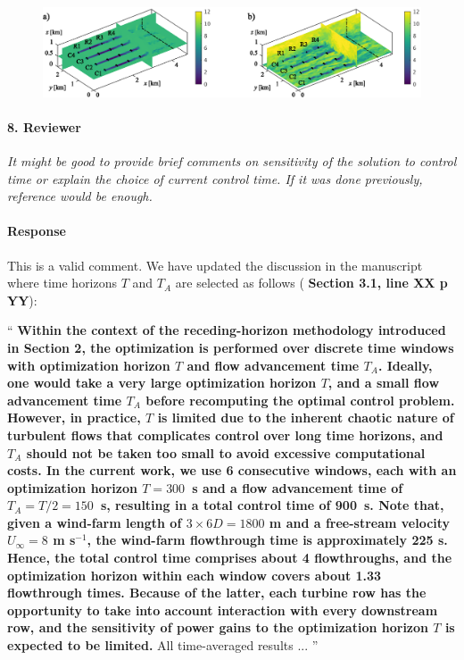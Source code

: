 \documentclass[]{article}
\newcommand{\red}[1]{\textbf{\color{red} #1}}
\newcommand{\revision}[1]{\textbf{#1}}
\begin{document}
\begin{figure}
	\includegraphics[width=\textwidth]{figure3_revised}
\end{figure}



\hrulefill

\paragraph{8. Reviewer} \textit{It might be good to provide brief comments on sensitivity of the solution to control time or explain the choice of current control time. If it was done previously, reference would be enough.}

\paragraph{Response} This is a valid comment. We have updated the discussion in the manuscript where time horizons $T$ and $T_A$ are selected as follows (\red{Section 3.1, line XX p YY}):

``
\revision{Within the context of the receding-horizon methodology introduced in Section 2, the optimization is performed over discrete time windows with optimization horizon $T$ and flow advancement time $T_A$. Ideally, one would take a very large optimization horizon $T$, and a small flow advancement time $T_A$ before recomputing the optimal control problem. However, in practice, $T$ is limited due to the inherent chaotic nature of turbulent flows that complicates control over long time horizons, and $T_A$ should not be taken too small to avoid excessive computational costs. In the current work, we use 6 consecutive windows, each with an optimization horizon $T=300$~s and a flow advancement time of $T_A = T/2= 150$~s, resulting in a total control time of 900~s. Note that, given a wind-farm length of $3 \times 6D = 1 800$ m and a free-stream velocity $U_\infty = 8$ m s$^{-1}$, the wind-farm flowthrough time is approximately 225 s. Hence, the total control time comprises about 4 flowthroughs, and the optimization horizon within each window covers about 1.33 flowthrough times. Because of the latter, each turbine row has the opportunity to take into account interaction with every downstream row, and the sensitivity of power gains to the optimization horizon $T$ is expected to be limited.} All time-averaged results ...
''
\end{document}
